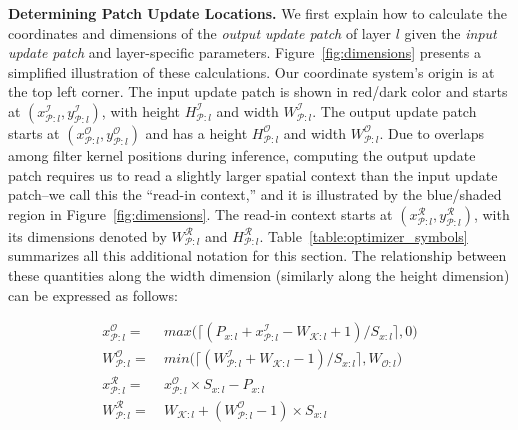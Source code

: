 \vspace{2mm}
\noindent \textbf{Determining Patch Update Locations.} We first explain how to calculate the coordinates and dimensions of the \textit{output update patch} of layer $l$ given the \textit{input update patch} and layer-specific parameters. Figure~\ref{fig:dimensions} presents a simplified illustration of these calculations.
Our coordinate system's origin is at the top left corner.
The input update patch is shown in red/dark color and starts at $(x^\mathcal{I}_{\mathcal{P}:l}, y^\mathcal{I}_{\mathcal{P}:l})$, with height $H^\mathcal{I}_{\mathcal{P}:l}$ and width $W^\mathcal{I}_{\mathcal{P}:l}$.
The output update patch starts at $(x^\mathcal{O}_{\mathcal{P}:l}, y^\mathcal{O}_{\mathcal{P}:l})$ and has a height $H^\mathcal{O}_{\mathcal{P}:l}$ and width $W^\mathcal{O}_{\mathcal{P}:l}$.
Due to overlaps among filter kernel positions during inference, computing the output update patch requires us to read a slightly larger spatial context than the input update patch--we call this the ``read-in context,'' and it is illustrated by the blue/shaded region in Figure~\ref{fig:dimensions}.
The read-in context starts at $(x^\mathcal{R}_{\mathcal{P}:l}, y^\mathcal{R}_{\mathcal{P}:l})$, with its dimensions denoted by $W^\mathcal{R}_{\mathcal{P}:l}$ and $H^\mathcal{R}_{\mathcal{P}:l}$.
Table~\ref{table:optimizer_symbols} summarizes all this additional notation for this section.
The relationship between these quantities along the width dimension (similarly along the height dimension) can be expressed as follows:

\vspace{-3mm}
\begin{align}
\label{eqn:xcoordinate}
x^\mathcal{O}_{\mathcal{P}:l} =&~ max\big(\lceil (P_{x:l} + x^\mathcal{I}_{\mathcal{P}:l} - W_{\mathcal{K}:l} + 1)/S_{x:l} \rceil, 0\big)\\
\label{eqn:patchwidth}
W^\mathcal{O}_{\mathcal{P}:l} =&~ min\big(\lceil (W^\mathcal{I}_{\mathcal{P}:l} + W_{\mathcal{K}:l} - 1)/ S_{x:l} \rceil, W_{\mathcal{O}:l}\big)\\
\label{eqn:xreadcoordinate}
x^\mathcal{R}_{\mathcal{P}:l} =&~ x^\mathcal{O}_{\mathcal{P}:l} \times S_{x:l} - P_{x:l}\\
\label{eqn:readpatchwidth}
W^\mathcal{R}_{\mathcal{P}:l} =&~ W_{\mathcal{K}:l} + (W^\mathcal{O}_{\mathcal{P}:l}-1) \times S_{x:l}
\end{align}
\vspace{-4mm}


